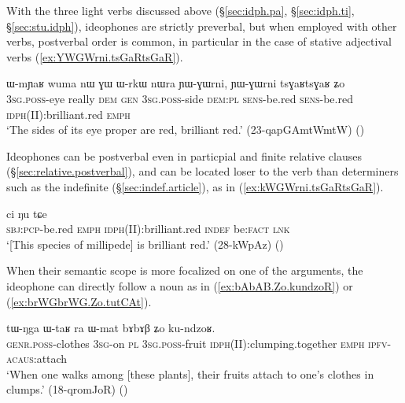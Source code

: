 With the three light verbs discussed above (§\ref{sec:idph.pa}, §\ref{sec:idph.ti}, §\ref{sec:stu.idph}), ideophones are strictly preverbal, but when employed with other verbs, postverbal order is common, in particular in the case of stative adjectival verbs (\ref{ex:YWGWrni.tsGaRtsGaR}).

\begin{exe}
\ex \label{ex:YWGWrni.tsGaRtsGaR}
\gll ɯ-mɲaʁ wuma nɯ ɣɯ ɯ-rkɯ nɯra ɲɯ-ɣɯrni, ɲɯ-ɣɯrni tsɣaʁtsɣaʁ ʑo \\
\textsc{3sg}.\textsc{poss}-eye really \textsc{dem} \textsc{gen} \textsc{3sg}.\textsc{poss}-side \textsc{dem}:\textsc{pl} \textsc{sens}-be.red  \textsc{sens}-be.red \textsc{idph}(II):brilliant.red \textsc{emph} \\
 \glt `The sides of its eye proper are red, brilliant red.'  (23-qapGAmtWmtW) 	()
 \end{exe}

Ideophones can be postverbal even in particpial and finite relative clauses (§\ref{sec:relative.postverbal}), and can be located loser to the verb than determiners such as the indefinite  (§\ref{sec:indef.article}), as in (\ref{ex:kWGWrni.tsGaRtsGaR}).

 \begin{exe}
\ex \label{ex:kWGWrni.tsGaRtsGaR}
 ci ŋu tɕe \\
\textsc{sbj}:\textsc{pcp}-be.red \textsc{emph} \textsc{idph}(II):brilliant.red \textsc{indef} be:\textsc{fact} \textsc{lnk} \\
\glt `[This species of millipede] is brilliant red.' (28-kWpAz)
()
   \end{exe} 
   
 When their semantic scope is more focalized on one of the arguments, the ideophone can directly follow a noun as in (\ref{ex:bAbAB.Zo.kundzoR}) or (\ref{ex:brWGbrWG.Zo.tutCAt}).

\begin{exe}
\ex \label{ex:bAbAB.Zo.kundzoR}
\gll tɯ-ŋga ɯ-taʁ ra ɯ-mat bɤbɤβ ʑo ku-ndzoʁ. \\
\textsc{genr}.\textsc{poss}-clothes \textsc{3sg}-on \textsc{pl}  \textsc{3sg}.\textsc{poss}-fruit \textsc{idph}(II):clumping.together \textsc{emph} \textsc{ipfv}-\textsc{acaus}:attach \\
\glt `When one walks among [these plants], their fruits attach to one's clothes in clumps.' (18-qromJoR)
()
\end{exe}


